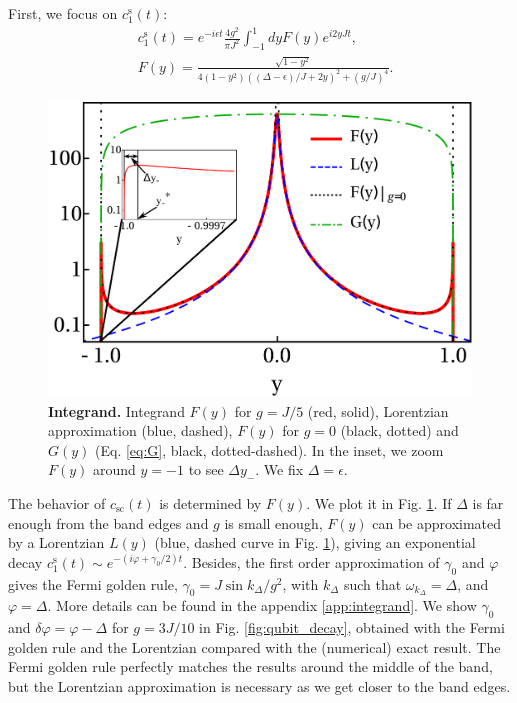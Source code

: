 \documentclass[aps,pra,twocolumn,floatfix,superscriptaddress]{revtex4-1}%
\begin{document}
First, we focus on  $c_1^\text{s}(t)$:
\begin{align}
&c_1^\text{s}(t) =  e^{-i\epsilon t}\frac{4g^2}{\pi J^2}\int_{-1}^1 dy F(y)e^{i2yJt}\label{eq:c_sc_app},\\
&F(y)=\frac{\sqrt{1-y^2}}{4(1-y^2)\left((\Delta-\epsilon)/J+2y\right)^2+(g/J)^4}.\label{eq:F}
\end{align}
\begin{figure}[thb!]
\includegraphics[width=1.0\columnwidth]{integrand_inset_Delta_0_g_0_2.pdf}
\caption{{\bf Integrand.} Integrand $F(y)$ for $g=J/5$ (red, solid), Lorentzian approximation (blue, dashed), $F(y)$ for $g=0$ (black, dotted) and $G(y)$ (Eq. \eqref{eq:G}, black, dotted-dashed). In the inset, we zoom $F(y)$ around $y=-1$ to see $\Delta y_-$. We fix $\Delta=\epsilon$.}\label{fig:integrand}
\end{figure}
The behavior of $c_\text{sc}(t)$ is determined by $F(y)$. We plot it in Fig. \ref{fig:integrand}. If  $\Delta$ is far enough from the band edges and $g$ is small enough, $F(y)$ can be approximated by a Lorentzian $L(y)$ (blue, dashed curve in Fig. \ref{fig:integrand}), giving an exponential decay $c_1^\text{s}(t)\sim e^{-(i\varphi+\gamma_0/2)t}$. 
Besides, 
the first order approximation of $\gamma_0$ and $\varphi$ gives the Fermi golden rule, $\gamma_0=J\sin k_\Delta/g^2$, with $k_\Delta$ such that $\omega_{k_\Delta}=\Delta$, and $\varphi=\Delta$. More details can be found in the appendix \ref{app:integrand}. We show $\gamma_0$ and $\delta\varphi=\varphi-\Delta$ for $g=3J/10$ in Fig. \ref{fig:qubit_decay},   obtained with the Fermi golden rule and the  Lorentzian compared   with the (numerical) exact result.  The Fermi golden rule perfectly matches the results around the middle of the band, but the Lorentzian approximation is necessary as we get closer to the band edges.
\end{document}
